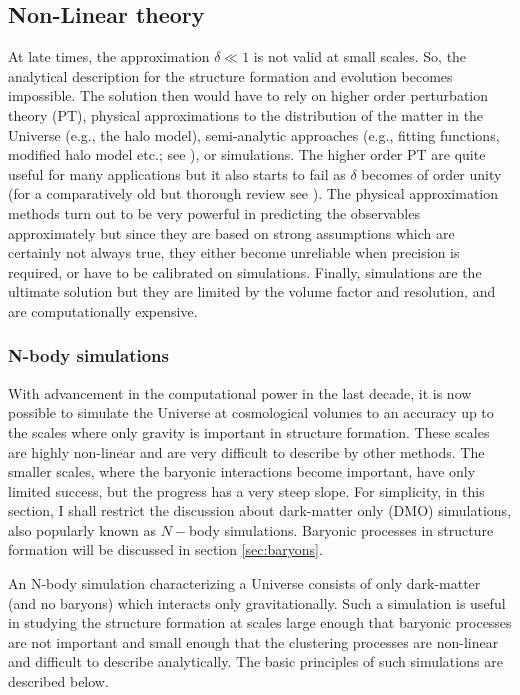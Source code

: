 \subsection{Non-Linear theory}

At late times, the approximation $\delta \ll 1$ is not valid at small scales. So, the analytical
description for the structure formation and evolution becomes impossible. 
The solution then would have to rely on higher order perturbation theory (PT), 
physical approximations to the
distribution of the matter in the Universe (e.g., the halo model), 
semi-analytic approaches (e.g., fitting functions, modified halo model etc.;
see \cite{Takahashi:2012em,Smith:2002dz}), or simulations. 
The higher order PT are quite useful for many applications but it also starts to 
fail as $\delta$ becomes of order unity (for a comparatively old
but thorough review see \cite{1994FCPh...15..209D}). The physical approximation methods turn 
out to be very powerful in predicting the observables approximately 
but since they are based on strong assumptions which are 
certainly not always true, they either become unreliable when precision is required, or have
to be calibrated on simulations. Finally, simulations are the ultimate solution but they
are limited by the volume factor and resolution, and are computationally expensive. 


\subsubsection{N-body simulations}

With advancement in the computational power in the last decade, it is now possible to
simulate the Universe at cosmological volumes to an accuracy up to the scales where
only gravity is important in structure formation. These scales are highly non-linear and are
very difficult to describe by other methods. The smaller scales, where the baryonic
interactions become important, have only limited success, but the progress has a very
steep slope. For simplicity, in this section, I shall restrict 
the discussion about dark-matter only (DMO)
simulations, also popularly known as $N-$body simulations. 
Baryonic processes in structure formation will be 
discussed in section \ref{sec:baryons}.

An N-body simulation
characterizing a Universe consists of only dark-matter (and no baryons) which
interacts only gravitationally. Such a simulation is useful in studying the
structure formation at scales large enough that baryonic processes are not 
important and small enough that the clustering processes are non-linear and difficult
to describe analytically. The basic principles of such simulations are described below.

